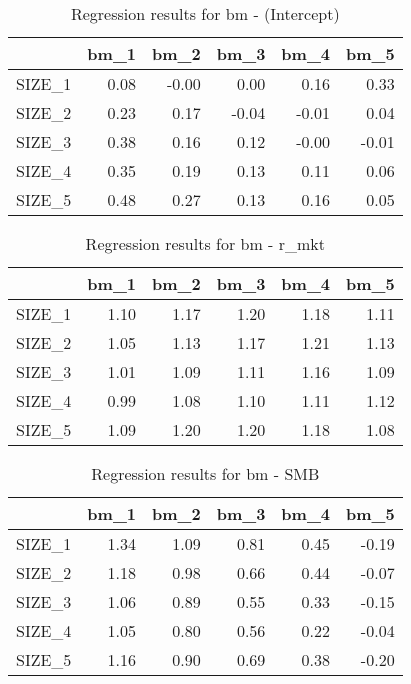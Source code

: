 \begin{table}[ht]
\centering
\caption{Regression results for bm - (Intercept)} 
\begin{tabular}{rrrrrr}
  \hline
 & bm\_1 & bm\_2 & bm\_3 & bm\_4 & bm\_5 \\ 
  \hline
SIZE\_1 & 0.08 & -0.00 & 0.00 & 0.16 & 0.33 \\ 
  SIZE\_2 & 0.23 & 0.17 & -0.04 & -0.01 & 0.04 \\ 
  SIZE\_3 & 0.38 & 0.16 & 0.12 & -0.00 & -0.01 \\ 
  SIZE\_4 & 0.35 & 0.19 & 0.13 & 0.11 & 0.06 \\ 
  SIZE\_5 & 0.48 & 0.27 & 0.13 & 0.16 & 0.05 \\ 
   \hline
\end{tabular}
\end{table}


\begin{table}[ht]
\centering
\caption{Regression results for bm - r_mkt} 
\begin{tabular}{rrrrrr}
  \hline
 & bm\_1 & bm\_2 & bm\_3 & bm\_4 & bm\_5 \\ 
  \hline
SIZE\_1 & 1.10 & 1.17 & 1.20 & 1.18 & 1.11 \\ 
  SIZE\_2 & 1.05 & 1.13 & 1.17 & 1.21 & 1.13 \\ 
  SIZE\_3 & 1.01 & 1.09 & 1.11 & 1.16 & 1.09 \\ 
  SIZE\_4 & 0.99 & 1.08 & 1.10 & 1.11 & 1.12 \\ 
  SIZE\_5 & 1.09 & 1.20 & 1.20 & 1.18 & 1.08 \\ 
   \hline
\end{tabular}
\end{table}


\begin{table}[ht]
\centering
\caption{Regression results for bm - SMB} 
\begin{tabular}{rrrrrr}
  \hline
 & bm\_1 & bm\_2 & bm\_3 & bm\_4 & bm\_5 \\ 
  \hline
SIZE\_1 & 1.34 & 1.09 & 0.81 & 0.45 & -0.19 \\ 
  SIZE\_2 & 1.18 & 0.98 & 0.66 & 0.44 & -0.07 \\ 
  SIZE\_3 & 1.06 & 0.89 & 0.55 & 0.33 & -0.15 \\ 
  SIZE\_4 & 1.05 & 0.80 & 0.56 & 0.22 & -0.04 \\ 
  SIZE\_5 & 1.16 & 0.90 & 0.69 & 0.38 & -0.20 \\ 
   \hline
\end{tabular}
\end{table}


